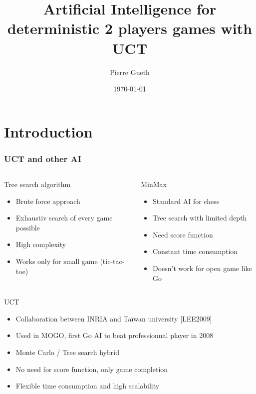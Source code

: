 \documentclass{beamer}
\title{Artificial Intelligence for deterministic 2 players games with UCT}
\author{Pierre Gueth}
\institute{}
\date{\today}
\begin{document}
\maketitle


\section{Introduction}

\begin{frame}
\frametitle{UCT and other AI}

\begin{columns}
\begin{column}{.45\linewidth}
\begin{block}{Tree search algorithm}
\begin{itemize}
\item Brute force approach
\item Exhaustiv search of every game possible
\item High complexity
\item Works only for small game (tic-tac-toe)
\end{itemize}
\end{block} 
\end{column}
\begin{column}{.5\linewidth}
\begin{block}{MinMax}
\begin{itemize}
\item Standard AI for chess
\item Tree search with limited depth
\item Need score function
\item Constant time consumption
\item Doesn't work for open game like Go
\end{itemize}
\end{block}
\end{column}
\end{columns}


\begin{block}{UCT}
\begin{itemize}
\item Collaboration between INRIA and Taïwan university [LEE2009]
\item Used in MOGO, first Go AI to beat professionnal player in 2008
\item Monte Carlo / Tree search hybrid
\item \alert<2>{No need for score function}, only game completion
\item \alert<2>{Flexible time consumption and high scalability}
\end{itemize}
\end{block}
\end{frame}
\end{document}
